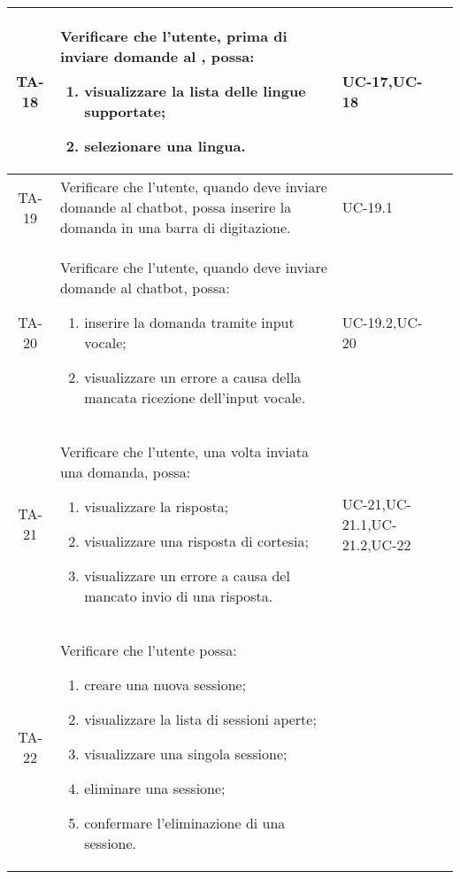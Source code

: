 \begin{xltabular}{\textwidth}{| c | X | X | c |}
    TA-18 & Verificare che l’utente, prima di inviare domande al , possa:
    \begin{enumerate}
        \item visualizzare la lista delle lingue supportate;
        \item selezionare una lingua.
    \end{enumerate}& UC-17,\newline UC-18 & \textcolor{xmarkcolor}{} \\
    \hline
    TA-19 & Verificare che l’utente, quando deve inviare domande al chatbot, possa inserire la domanda in una barra di digitazione.& UC-19.1 & \textcolor{cmarkcolor}{} \\
    \hline
    TA-20 & Verificare che l’utente, quando deve inviare domande al chatbot, possa:
    \begin{enumerate}
        \item inserire la domanda tramite input vocale;
        \item visualizzare un errore a causa della mancata ricezione dell'input vocale.
    \end{enumerate}& UC-19.2,\newline UC-20 & \textcolor{xmarkcolor}{} \\
    \hline
    TA-21 & Verificare che l’utente, una volta inviata una domanda, possa:
    \begin{enumerate}
        \item visualizzare la risposta;
        \item visualizzare una risposta di cortesia;
        \item visualizzare un errore a causa del mancato invio di una risposta.
    \end{enumerate}& UC-21,\newline UC-21.1,\newline UC-21.2,\newline UC-22 & \textcolor{cmarkcolor}{} \\
    \hline
     TA-22 & Verificare che l’utente possa:
    \begin{enumerate}
        \item creare una nuova sessione;
        \item visualizzare la lista di sessioni aperte;
        \item visualizzare una singola sessione;
        \item eliminare una sessione;
        \item confermare l'eliminazione di una sessione.

\end{enumerate}
\end{xltabular}
